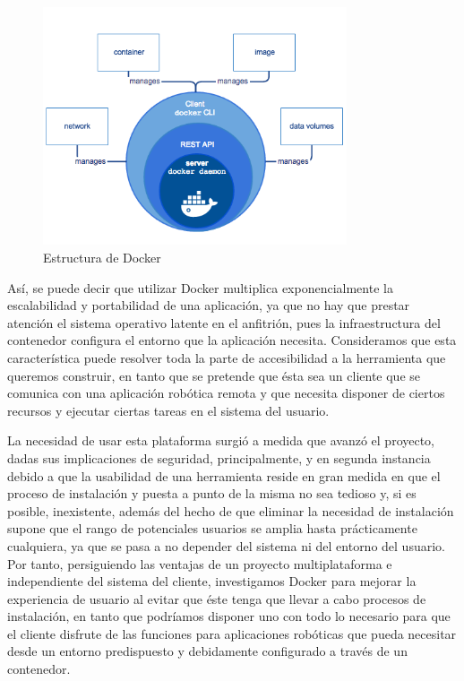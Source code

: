 \begin{figure}[!hbtp]  \centering\noindent
    \includegraphics[width=0.8\textwidth]{figures/docker-engine.png}
    \caption{Estructura de Docker}
    \label{docker}
\end{figure}

Así, se puede decir que utilizar Docker multiplica exponencialmente la escalabilidad y portabilidad de una aplicación, ya que no hay que prestar atención el sistema operativo latente en el anfitrión, pues la infraestructura del contenedor configura el entorno que la aplicación necesita. Consideramos que esta característica puede resolver toda la parte de accesibilidad a la herramienta que queremos construir, en tanto que se pretende que ésta sea un cliente que se comunica con una aplicación robótica remota y que necesita disponer de ciertos recursos y ejecutar ciertas tareas en el sistema del usuario.

La necesidad de usar esta plataforma surgió a medida que avanzó el proyecto, dadas sus implicaciones de seguridad, principalmente, y en segunda instancia debido a que la usabilidad de una herramienta reside en gran medida en que el proceso de instalación y puesta a punto de la misma no sea tedioso y, si es posible, inexistente, además del hecho de que eliminar la necesidad de instalación supone que el rango de potenciales usuarios se amplia hasta prácticamente cualquiera, ya que se pasa a no depender del sistema ni del entorno del usuario. Por tanto, persiguiendo las ventajas de un proyecto multiplataforma e independiente del sistema del cliente, investigamos Docker para mejorar la experiencia de usuario al evitar que éste tenga que llevar a cabo procesos de instalación, en tanto que podríamos disponer uno con todo lo necesario para que el cliente disfrute de las funciones para aplicaciones robóticas que pueda necesitar desde un entorno predispuesto y debidamente configurado a través de un contenedor.

